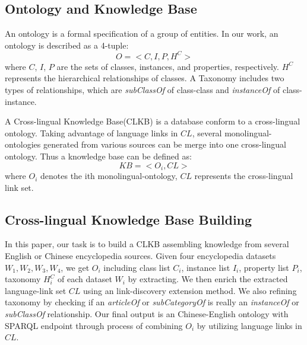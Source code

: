 \documentclass[runningheads,a4paper]{llncs}
\begin{document}
\subsection{Ontology and Knowledge Base}

An ontology is a formal specification of a group of entities. In our work, an ontology is described as a 4-tuple:
\begin{equation}
    O = <C,I,P,H^C>
\end{equation}
where $C$, $I$, $P$ are the sets of classes, instances, and properties, respectively. $H^C$ represents the hierarchical relationships of classes. A Taxonomy includes two types of relationships, which are \textit{subClassOf} of class-class and \textit{instanceOf} of class-instance.

A Cross-lingual Knowledge Base(CLKB) is a database conform to a cross-lingual ontology. Taking advantage of language links in $CL$, several monolingual-ontologies generated from various sources can be merge into one cross-lingual ontology.  Thus a knowledge base can be defined as:
\begin{equation}
    KB = <O_{i}, CL>
\end{equation}
where $O_{i}$ denotes the ith monolingual-ontology, $CL$ represents the cross-lingual link set.

\subsection{Cross-lingual Knowledge Base Building}

In this paper, our task is to build a CLKB assembling knowledge from several English or Chinese encyclopedia sources. Given four encyclopedia datasets $W_{1},W_{2},W_{3},W_{4}$, we get $O_{i}$ including class list $C_{i}$, instance list $I_{i}$, property list $P_{i}$, taxonomy $H^C_{i}$ of each dataset $W_{i}$ by extracting. We then enrich the extracted language-link set $CL$ using an link-discovery extension method. We also refining taxonomy by checking if an \textit{articleOf} or \textit{subCategoryOf} is really an \textit{instanceOf} or \textit{subClassOf} relationship. Our final output is an Chinese-English ontology with SPARQL endpoint through process of combining $O_{i}$ by utilizing language links in $CL$.
\end{document}
